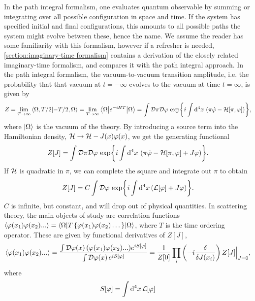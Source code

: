 In the path integral formalism, one evaluates quantum observable by summing or integrating over all possible configuration in space and time.
If the system has specified initial and final configurations, this amounts to all possible paths the system might evolve between these, hence the name.
We assume the reader has some familiarity with this formalism, however if a refresher is needed, \autoref{section:imaginary-time formalism} contains a derivation of the closely related imaginary-time formalism, and compares it with the path integral approach.
In the path integral formalism, the vacuum-to-vacuum transition amplitude, i.e. the probability that that vacuum at $t = -\infty$ evolves to the vacuum at time $t = \infty$, is given by
\begin{equation}
    Z = \lim_{T\rightarrow \infty} \braket{\Omega, T/2}{-T/2, \Omega}
    = \lim_{T\rightarrow \infty} \left\langle \Omega {\left|  e^{-iHT}  \right|} \Omega \right\rangle
    = \int \mathcal{D} \pi \mathcal{D} \varphi \, \exp{ i \int \dd^4 x \, \left(\pi \dot \varphi - \mathcal{H}[\pi, \varphi]\right) },
\end{equation}
where $\ket{\Omega}$ is the vacuum of the theory.
By introducing a source term into the Hamiltonian density, $\mathcal{H} \rightarrow \mathcal{H} - J(x)\varphi(x)$, we get the generating functional
\begin{equation}
    Z[J] = 
    \int \mathcal{D} \pi \mathcal{D} \varphi \, 
    \exp{ i \int \dd^4 x \, \left(\pi \dot \varphi - \mathcal{H}[\pi, \varphi]+ J\varphi\right) }.
\end{equation}
If $\mathcal{H}$ is quadratic in $\pi$, we can complete the square and integrate out $\pi$ to obtain
\begin{equation}
    Z[J] = C \int \mathcal{D} \varphi \, \exp{i \int \dd^4 x\, (\mathcal{L}[\varphi] + J \varphi)}.
\end{equation}
$C$ is infinite, but constant, and will drop out of physical quantities.
In scattering theory, the main objects of study are correlation functions $\ex{\varphi(x_1)\varphi(x_2)...} = \inner{\Omega}{T\left\{\varphi(x_1)\varphi(x_2)\dots\right\}}{\Omega}$, where $T$ is the time ordering operator.
These are given by functional derivatives of $Z[J]$, 
\begin{equation}
    \label{correlator from generating functional}
    \ex{\varphi(x_1)\varphi(x_2)...}
    = 
    \frac{\int \D \varphi(x)\,  (\varphi(x_1)\varphi(x_2)...) e^{i S[\varphi]}}
        {\int \D \varphi(x)\, e^{i S[\varphi]}}
    =
    \frac{1}{Z[0]} \prod_i\left( -i  \fdv{J(x_i)}\right) Z[J]\Big|_{J = 0},
\end{equation}
where 
\begin{equation}
    S[\varphi] = \int \dd^4 x \, \mathcal{L}[\varphi]
\end{equation}
